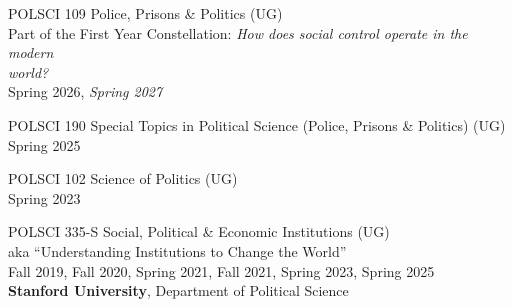 \documentclass[11pt]{article}
\begin{document}
\begin{minipage}[t]{.79\textwidth}
	\hspace*{.1in} POLSCI 109\hspace{.1in} Police, Prisons \& Politics (UG) \\
	\hspace*{.1in} Part of the First Year Constellation: \emph{How does social control operate in the modern} \\
	\hspace*{.1in} \emph{world?} \\
	\hspace*{.1in} Spring 2026, \emph{Spring 2027} \\
	\vspace{-.05in}

	\hspace*{.1in} POLSCI 190\hspace{.1in} Special Topics in Political Science (Police, Prisons \& Politics) (UG) \\
	\hspace*{.1in} Spring 2025 \\
	\vspace{-.05in}

	\hspace*{.1in} POLSCI 102\hspace{.1in} Science of Politics (UG) \\
	\hspace*{.1in} Spring 2023 \\
	\vspace{-.05in}


	\hspace*{.1in} POLSCI 335-S\hspace{.1in} Social, Political \& Economic Institutions (UG) \\
	\hspace*{.1in}  aka ``Understanding Institutions to Change the World'' \\
	\hspace*{.1in}  Fall 2019, Fall 2020, Spring 2021, Fall 2021, Spring 2023, Spring 2025 \\

	\vspace{.11in}
	\textbf{Stanford University}, Department of Political Science  \\
	\vspace{-.13in}


\end{minipage}
\end{document}
